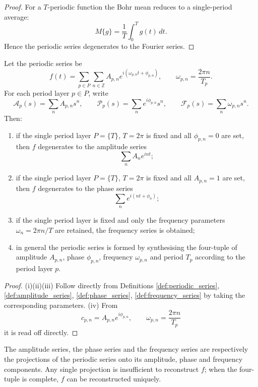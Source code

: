 \begin{proof}
For a $T$-periodic function the Bohr mean reduces to a single-period average:
\[
M\{g\} = \frac{1}{T}\int_0^T g(t)\,dt.
\]
Hence the periodic series degenerates to the Fourier series.
\end{proof}

\begin{proposition}\label{prop:periodic_series_synthesis}
Let the periodic series be
\[
f(t)=\sum_{p\in P}\sum_{n\in\mathbb Z}A_{p,n}e^{i(\omega_{p,n}t+\phi_{p,n})},
\qquad \omega_{p,n}=\frac{2\pi n}{T_p}.
\]
For each period layer $p\in P$, write
\[
\mathcal A_p(s)=\sum_n A_{p,n}s^n,\qquad
\mathcal P_p(s)=\sum_n e^{i\phi_{p,n}}s^n,\qquad
\mathcal F_p(s)=\sum_n \omega_{p,n}s^n.
\]
Then:
\begin{enumerate}[label=(\roman*)]
    \item if the single period layer $P=\{T\}$, $T=2\pi$ is fixed and all $\phi_{p,n}=0$ are set, then $f$ degenerates to the amplitude series
    \[
    \sum_n A_n e^{int};
    \]
    \item if the single period layer $P=\{T\}$, $T=2\pi$ is fixed and all $A_{p,n}=1$ are set, then $f$ degenerates to the phase series
    \[
    \sum_n e^{i(nt+\phi_n)};
    \]
    \item if the single period layer is fixed and only the frequency parameters $\omega_n=2\pi n/T$ are retained, the frequency series is obtained;
    \item in general the periodic series is formed by synthesising the four-tuple of amplitude $A_{p,n}$, phase $\phi_{p,n}$, frequency $\omega_{p,n}$ and period $T_p$ according to the period layer $p$.
\end{enumerate}
\end{proposition}

\begin{proof}
(i)(ii)(iii) Follow directly from Definitions \ref{def:periodic_series}, \ref{def:amplitude_series}, \ref{def:phase_series}, \ref{def:frequency_series} by taking the corresponding parameters. (iv) From
\[
c_{p,n}=A_{p,n}e^{i\phi_{p,n}},\qquad \omega_{p,n}=\frac{2\pi n}{T_p}
\]
it is read off directly.
\end{proof}

\begin{corollary}\label{cor:periodic_series_projections}
The amplitude series, the phase series and the frequency series are respectively the projections of the periodic series onto its amplitude, phase and frequency components. Any single projection is insufficient to reconstruct $f$; when the four-tuple is complete, $f$ can be reconstructed uniquely.
\end{corollary}

